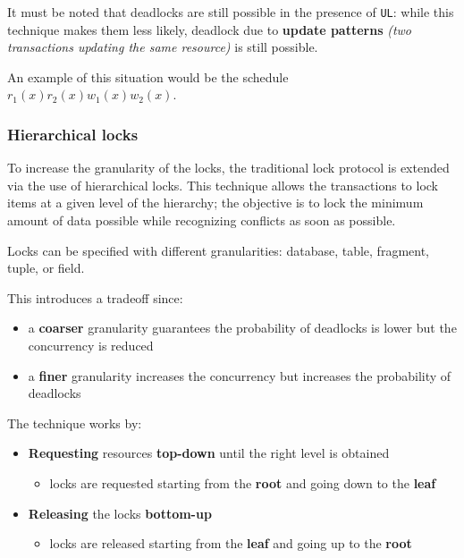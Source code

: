 \documentclass[english]{article}
\begin{document}
\bigskip
It must be noted that deadlocks are still possible in the presence of \texttt{UL}:
while this technique makes them less likely, deadlock due to \textbf{update patterns} \textit{(two transactions updating the same resource)} is still possible.

An example of this situation would be the schedule \(r_1(x) r_2(x) w_1(x) w_2(x)\).

\subsubsection{Hierarchical locks}

To increase the granularity of the locks, the traditional lock protocol is extended via the use of hierarchical locks.
This technique allows the transactions to lock items at a given level of the hierarchy;
the objective is to lock the minimum amount of data possible while recognizing conflicts as soon as possible.

\begin{minipage}{0.8\textwidth}
  \bigskip
  Locks can be specified with different granularities: database, table, fragment, tuple, or field.

  This introduces a tradeoff since:
  \begin{itemize}
    \item a \textbf{coarser} granularity guarantees the probability of deadlocks is lower but the concurrency is reduced
    \item a \textbf{finer} granularity increases the concurrency but increases the probability of deadlocks
  \end{itemize}
  \bigskip
\end{minipage}
\begin{minipage}{0.195\textwidth}
  \bigskip
  \centering
  \bigskip
\end{minipage}

\bigskip
The technique works by:

\begin{itemize}
  \item \textbf{Requesting} resources \textbf{top-down} until the right level is obtained
        \begin{itemize}[label=\(\downarrow\)]
          \item locks are requested starting from the \textbf{root} and going down to the \textbf{leaf}
        \end{itemize}
  \item \textbf{Releasing} the locks \textbf{bottom-up}
        \begin{itemize}[label=\(\uparrow\)]
          \item locks are released starting from the \textbf{leaf} and going up to the \textbf{root}
        \end{itemize}
\end{itemize}
\end{document}

